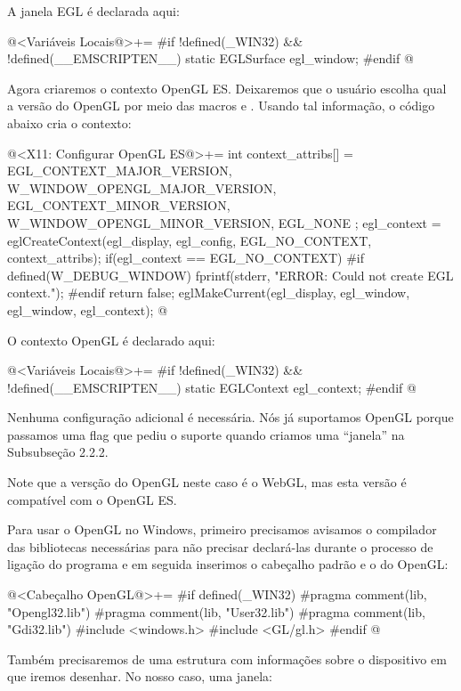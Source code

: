 A janela EGL é declarada aqui:

\iniciocodigo
@<Variáveis Locais@>+=
#if !defined(_WIN32) && !defined(__EMSCRIPTEN__)
static EGLSurface egl_window;
#endif
@
\fimcodigo


Agora criaremos o contexto OpenGL ES. Deixaremos que o usuário escolha
qual a versão do OpenGL por meio das
macros  e
. Usando tal informação, o código abaixo cria o contexto:

\iniciocodigo
@<X11: Configurar OpenGL ES@>+=
{
  int context_attribs[] = {
    EGL_CONTEXT_MAJOR_VERSION, W_WINDOW_OPENGL_MAJOR_VERSION,
    EGL_CONTEXT_MINOR_VERSION, W_WINDOW_OPENGL_MINOR_VERSION,
    EGL_NONE
  };
  egl_context = eglCreateContext(egl_display, egl_config,
                                 EGL_NO_CONTEXT, context_attribs);
  if(egl_context == EGL_NO_CONTEXT){
#if defined(W_DEBUG_WINDOW)
    fprintf(stderr, "ERROR: Could not create EGL context.\n");
#endif
    return false;
  }
  eglMakeCurrent(egl_display, egl_window, egl_window, egl_context);
}
@
\fimcodigo

O contexto OpenGL é declarado aqui:

\iniciocodigo
@<Variáveis Locais@>+=
#if !defined(_WIN32) && !defined(__EMSCRIPTEN__)
static EGLContext egl_context;
#endif
@
\fimcodigo


Nenhuma configuração adicional é necessária. Nós já suportamos OpenGL
porque passamos uma flag que pediu o suporte quando criamos uma
``janela'' na Subsubseção 2.2.2.

Note que a versção do OpenGL neste caso é o WebGL, mas esta versão é
compatível com o OpenGL ES.


Para usar o OpenGL no Windows, primeiro precisamos avisamos o
compilador das bibliotecas necessárias para não precisar declará-las
durante o processo de ligação do programa e em seguida inserimos o
cabeçalho padrão e o do OpenGL:

\iniciocodigo
@<Cabeçalho OpenGL@>+=
#if defined(_WIN32)
#pragma comment(lib, "Opengl32.lib")
#pragma comment(lib, "User32.lib")
#pragma comment(lib, "Gdi32.lib")
#include <windows.h>
#include <GL/gl.h>
#endif
@
\fimcodigo

Também precisaremos de uma estrutura com informações sobre o
dispositivo em que iremos desenhar. No nosso caso, uma janela:


